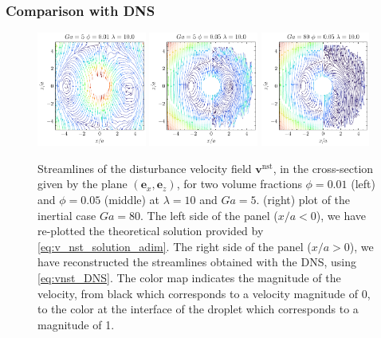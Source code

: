 \documentclass{sintefbeamer}
\begin{document}

\begin{frame}
  \frametitle{Comparison with DNS}
  \begin{figure}
    \centering
    \includegraphics[width = 0.32\textwidth]{image/HOMOGENEOUS_final/Stream/Stream_PHI_1_Ga_5_l_10.pdf}
    \includegraphics[width = 0.32\textwidth]{image/HOMOGENEOUS_final/Stream/Stream_PHI_5_Ga_5_l_10.pdf}
    \includegraphics[width = 0.32\textwidth]{image/HOMOGENEOUS_final/Stream/Stream_PHI_5_Ga_80_l_10.pdf}
    \caption{\footnotesize
      Streamlines of the disturbance velocity field $\textbf{v}^\text{nst}$, in the cross-section given by the plane $(\textbf{e}_x,\textbf{e}_z)$, for two volume fractions $\phi = 0.01$ (left) and $\phi = 0.05$ (middle) at $\lambda = 10$ and $Ga = 5$.
    (right) plot of the inertial case $Ga = 80$. 
    The left side of the panel ($x/a < 0$), we have re-plotted the theoretical solution provided by \ref{eq:v_nst_solution_adim}.   
    The right side of the panel ($x/a > 0$), we have reconstructed the streamlines obtained with the DNS, using \ref{eq:vnst_DNS}. 
    The color map indicates the magnitude of the velocity, from black which corresponds to a velocity magnitude of 0, to the color at the interface of the droplet which corresponds to a magnitude of 1.}
    \label{fig:vnst_DNS}
\end{figure}
\end{frame}
\end{document}
